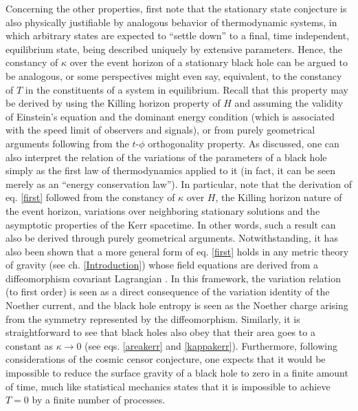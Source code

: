 \documentclass[
12pt,		%
openright,	%
twoside,  %
a4paper,			%
chapter=TITLE,		%
english,			%
french,				%
spanish,			%
brazil				%
]{USPSC-classe/USPSC}
\begin{document}
Concerning the other properties, first note that the stationary state conjecture is also physically justifiable by analogous behavior of thermodynamic systems, in which arbitrary states are expected to ``settle down'' to a final, time independent, equilibrium state, being described uniquely by extensive parameters. Hence, the constancy of $\kappa$ over the event horizon of a stationary black hole can be argued to be analogous, or some perspectives might even say, equivalent, to the constancy of $T$ in the constituents of a system in equilibrium. Recall that this property may be derived by using the Killing horizon property of $H$ and assuming the validity of Einstein's equation and the dominant energy condition (which is associated with the speed limit of observers and signals), or from purely geometrical arguments following from the $t$-$\phi$ orthogonality property. As discussed, one can also interpret the relation of the variations of the parameters of a black hole simply as the first law of thermodynamics applied to it (in fact, it can be seen merely as an ``energy conservation law''). In particular, note that the derivation of eq. \ref{first} followed from the constancy of $\kappa$ over $H$, the Killing horizon nature of the event horizon, variations over neighboring stationary solutions and the asymptotic properties of the Kerr spacetime. In other words, such a result can also be derived through purely geometrical arguments. Notwithstanding, it has also been shown \cite{Iyer1994} that a more general form of eq. \ref{first} holds in any metric theory of gravity (see ch. \ref{Introduction}) whose field equations are derived from a diffeomorphism covariant Lagrangian \cite{Wald1993, Rácz1992, Iyer1995}. In this framework, the variation relation (to first order) is seen as a direct consequence of the variation identity of the Noether current, and the black hole entropy is seen as the Noether charge arising from the symmetry represented by the diffeomorphism. Similarly, it is straightforward to see that black holes also obey that their area goes to a constant as $\kappa\to0$ (see eqs. \ref{areakerr} and \ref{kappakerr}). Furthermore, following considerations of the cosmic censor conjecture, one expects that it would be impossible to reduce the surface gravity of a black hole to zero in a finite amount of time, much like statistical mechanics states that it is impossible to achieve $T=0$ by a finite number of processes. 
\end{document}
